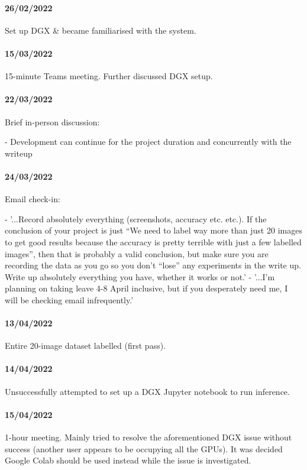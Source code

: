 \begin{appendices}
\paragraph{26/02/2022}
Set up DGX \& became familiarised with the system.

\paragraph{15/03/2022}
15-minute Teams meeting. Further discussed DGX setup.

\paragraph{22/03/2022}
Brief in-person discussion:

- Development can continue for the project duration and concurrently with the writeup

\paragraph{24/03/2022}
Email check-in:

- '...Record absolutely everything (screenshots, accuracy etc. etc.). If the conclusion of your project is just “We need to label way more than just 20 images to get good results because the accuracy is pretty terrible with just a few labelled images”, then that is probably a valid conclusion, but make sure you are recording the data as you go so you don’t “lose” any experiments in the write up. Write up absolutely everything you have, whether it works or not.'
- '...I’m planning on taking leave 4-8 April inclusive, but if you desperately need me, I will be checking email infrequently.'

\paragraph{13/04/2022}
Entire 20-image dataset labelled (first pass).

\paragraph{14/04/2022}
Unsuccessfully attempted to set up a DGX Jupyter notebook to run inference.

\paragraph{15/04/2022}
1-hour meeting. Mainly tried to resolve the aforementioned DGX issue without success (another user appears to be occupying all the GPUs). It was decided Google Colab should be used instead while the issue is investigated.


\end{appendices}
